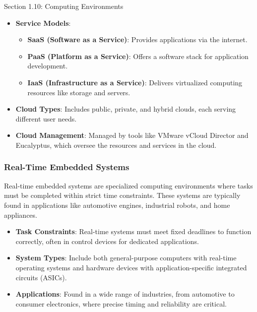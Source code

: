 \begin{notes}{Section 1.10: Computing Environments}
\begin{highlight}
    \begin{itemize}
        \item \textbf{Service Models}: 
            \begin{itemize}
                \item \textbf{SaaS (Software as a Service)}: Provides applications via the internet.
                \item \textbf{PaaS (Platform as a Service)}: Offers a software stack for application development.
                \item \textbf{IaaS (Infrastructure as a Service)}: Delivers virtualized computing resources like storage and servers.
            \end{itemize}
        \item \textbf{Cloud Types}: Includes public, private, and hybrid clouds, each serving different user needs.
        \item \textbf{Cloud Management}: Managed by tools like VMware vCloud Director and Eucalyptus, which oversee the resources and services in the cloud.
    \end{itemize}
    
    \end{highlight}
    
    \subsubsection*{Real-Time Embedded Systems}
    
    Real-time embedded systems are specialized computing environments where tasks must be completed within strict time constraints. These systems are typically found in applications like automotive 
    engines, industrial robots, and home appliances.
    
    \begin{highlight}
    
    \begin{itemize}
        \item \textbf{Task Constraints}: Real-time systems must meet fixed deadlines to function correctly, often in control devices for dedicated applications.
        \item \textbf{System Types}: Include both general-purpose computers with real-time operating systems and hardware devices with application-specific integrated circuits (ASICs).
        \item \textbf{Applications}: Found in a wide range of industries, from automotive to consumer electronics, where precise timing and reliability are critical.
    \end{itemize}
    

\end{highlight}
\end{notes}
